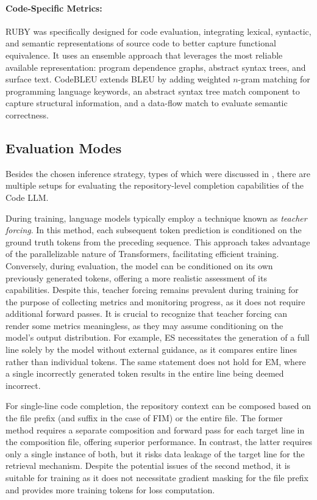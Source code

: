 \paragraph{Code-Specific Metrics:} RUBY \parencite{tran2019} was specifically designed for code evaluation, integrating lexical, syntactic, and semantic representations of source code to better capture functional equivalence. It uses an ensemble approach that leverages the most reliable available representation: program dependence graphs, abstract syntax trees, and surface text. CodeBLEU \parencite{ren2020} extends BLEU by adding weighted \(n\)-gram matching for programming language keywords, an abstract syntax tree match component to capture structural information, and a data-flow match to evaluate semantic correctness.

\subsection{Evaluation Modes}

Besides the chosen inference strategy, types of which were discussed in , there are multiple setups for evaluating the repository-level completion capabilities of the Code LLM.

During training, language models typically employ a technique known as \textit{teacher forcing}. In this method, each subsequent token prediction is conditioned on the ground truth tokens from the preceding sequence. This approach takes advantage of the parallelizable nature of Transformers, facilitating efficient training. Conversely, during evaluation, the model can be conditioned on its own previously generated tokens, offering a more realistic assessment of its capabilities. Despite this, teacher forcing remains prevalent during training for the purpose of collecting metrics and monitoring progress, as it does not require additional forward passes. It is crucial to recognize that teacher forcing can render some metrics meaningless, as they may assume conditioning on the model's output distribution. For example, ES necessitates the generation of a full line solely by the model without external guidance, as it compares entire lines rather than individual tokens. The same statement does not hold for EM, where a single incorrectly generated token results in the entire line being deemed incorrect.

For single-line code completion, the repository context can be composed based on the file prefix (and suffix in the case of FIM) or the entire file. The former method requires a separate composition and forward pass for each target line in the composition file, offering superior performance. In contrast, the latter requires only a single instance of both, but it risks data leakage of the target line for the retrieval mechanism. Despite the potential issues of the second method, it is suitable for training as it does not necessitate gradient masking for the file prefix and provides more training tokens for loss computation.

